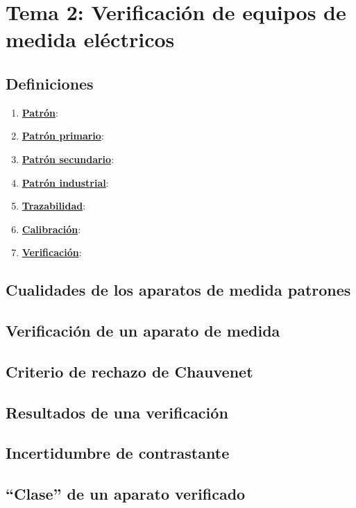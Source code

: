 \section{Tema 2: Verificación de equipos de medida eléctricos}
\subsection{Definiciones}
\begin{enumerate}
	\item \underline{\textbf{Patrón}}: 
	\item \underline{\textbf{Patrón primario}}: 
	\item \underline{\textbf{Patrón secundario}}: 
	\item \underline{\textbf{Patrón industrial}}: 
	\item \underline{\textbf{Trazabilidad}}: 
	\item \underline{\textbf{Calibración}}: 
	\item \underline{\textbf{Verificación}}: 
\end{enumerate}
\subsection{Cualidades de los aparatos de medida patrones}
\subsection{Verificación de un aparato de medida}
\subsection{Criterio de rechazo de Chauvenet}
\subsection{Resultados de una verificación}
\subsection{Incertidumbre de contrastante}
\subsection{“Clase” de un aparato verificado}




